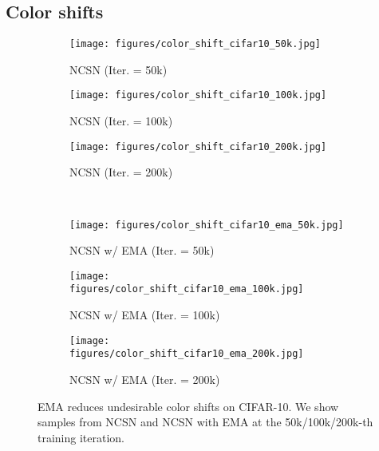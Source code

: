\documentclass{article}
\begin{document}
\subsection{Color shifts}\label{app:color}
\begin{figure}[H]
    \centering
    \begin{subfigure}{0.32\textwidth}
        \texttt{[image: figures/color\_shift\_cifar10\_50k.jpg]}
        \caption{NCSN (Iter. = 50k)}
    \end{subfigure}
    \begin{subfigure}{0.32\textwidth}
        \texttt{[image: figures/color\_shift\_cifar10\_100k.jpg]}
        \caption{NCSN (Iter. = 100k)}
    \end{subfigure}
    \begin{subfigure}{0.32\textwidth}
        \texttt{[image: figures/color\_shift\_cifar10\_200k.jpg]}
        \caption{NCSN (Iter. = 200k)}
    \end{subfigure}\\
    \begin{subfigure}{0.32\textwidth}
        \texttt{[image: figures/color\_shift\_cifar10\_ema\_50k.jpg]}
        \caption{NCSN w/ EMA (Iter. = 50k)}
    \end{subfigure}
    \begin{subfigure}{0.32\textwidth}
        \texttt{[image: figures/color\_shift\_cifar10\_ema\_100k.jpg]}
        \caption{NCSN w/ EMA (Iter. = 100k)}
    \end{subfigure}
    \begin{subfigure}{0.32\textwidth}
        \texttt{[image: figures/color\_shift\_cifar10\_ema\_200k.jpg]}
        \caption{NCSN w/ EMA (Iter. = 200k)}
    \end{subfigure}
    \caption{EMA reduces undesirable color shifts on CIFAR-10. We show samples from NCSN and NCSN with EMA at the 50k/100k/200k-th training iteration.}
    \label{fig:color_shift_cifar10}
\end{figure}
\newpage
\vspace*{2.5cm}
\end{document}
